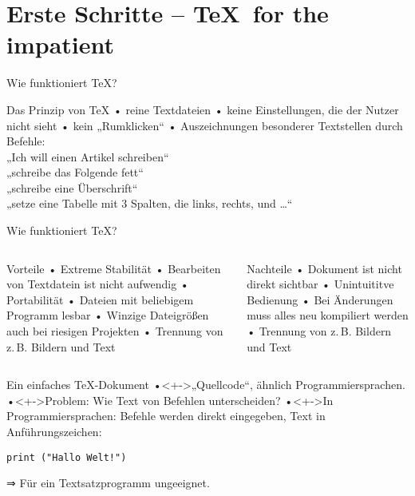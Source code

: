 \section[Erste Schritte]{Erste Schritte – \TeX\ for the impatient}
\begin{frame}[fragile]{Wie funktioniert \TeX?}
\begin{block}{Das Prinzip von \TeX}
• reine Textdateien
• keine Einstellungen, die der Nutzer nicht sieht
• kein „Rumklicken“
• Auszeichnungen besonderer Textstellen durch Befehle:\\%
  „Ich will einen Artikel schreiben“\\%
  „schreibe das Folgende fett“\\%
  „schreibe eine Überschrift“\\%
  „setze eine Tabelle mit 3 Spalten, die links, rechts, und …“
\•
\end{block}
\end{frame}

\begin{frame}{Wie funktioniert \TeX?}
\begin{columns}\begin{column}{.45\textwidth} 
\begin{block}{ Vorteile}
• Extreme Stabilität
• Bearbeiten von Textdatein ist nicht aufwendig
• Portabilität
• Dateien mit beliebigem Programm lesbar
• Winzige Dateigrößen auch bei riesigen Projekten
• Trennung von z.\,B. Bildern und Text
\• 
\end{block}
\end{column}
\begin{column}{.45\textwidth}
\begin{block}{ Nachteile}
• Dokument ist nicht direkt sichtbar
• Unintuititve Bedienung
• Bei Änderungen muss alles neu kompiliert werden
• Trennung von z.\,B. Bildern und Text
\•
\end{block}
\end{column}
\end{columns}
\end{frame}

\begin{frame}[fragile]{Ein einfaches \TeX-Dokument}
•<+->„Quellcode“, ähnlich Programmiersprachen.
•<+->Problem: Wie Text von Befehlen unterscheiden?
•<+->In Programmiersprachen: Befehle werden direkt eingegeben, Text in Anführungszeichen:
\•
\pause
\begin{lstlisting}
print ("Hallo Welt!")
\end{lstlisting}
⇒ Für ein Textsatzprogramm ungeeignet.
\end{frame}


